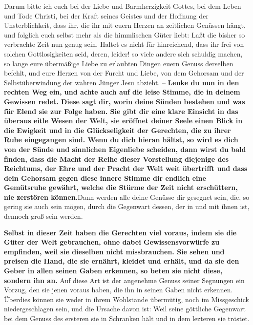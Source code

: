 \label{ref:04_23_innere_stimme}
Darum bitte ich euch bei der Liebe und Barmherzigkeit Gottes, bei dem Leben und
Tode Christi, bei der Kraft seines Geistes und der Hoffnung der Unsterblichkeit,
dass ihr, die ihr mit euern Herzen an zeitlichen Genüssen hängt, und folglich
euch selbst mehr als die himmlischen Güter liebt: Laßt die bisher so
verbrachte Zeit nun genug sein. Haltet es nicht für hinreichend, dass ihr frei
von solchen Gottlosigkeiten seid, deren, leider! so viele andere sich schuldig
machen, so lange eure übermäßige Liebe zu erlaubten Dingen euern Genuss
derselben
befehlt, und eure Herzen von der Furcht und Liebe, von dem Gehorsam und der
Selbstüberwindung der wahren Jünger Jesu abzieht. -- \textbf{Lenke du nun in den
rechten Weg ein, und achte auch auf die leise Stimme, die in deinem Gewissen
redet.
Diese sagt dir, worin deine Sünden bestehen und was für Elend sie zur Folge
haben. Sie gibt dir eine klare Einsicht in das überaus eitle Wesen der Welt,
sie eröffnet deiner Seele einen Blick in die Ewigkeit und in die Glückseligkeit
der Gerechten, die zu ihrer Ruhe eingegangen sind. Wenn du dich hieran hältst,
so wird es dich von der Sünde und sinnlichen Eigenliebe scheiden, dann wirst du
bald finden, dass die Macht der Reihe dieser Vorstellung diejenige des
Reichtums, der Ehre und der Pracht der Welt weit übertrifft und dass dein
Gehorsam gegen diese innere Stimme
dir endlich eine Gemütsruhe gewährt, welche
die Stürme der Zeit nicht erschüttern, nie zerstören können.}Dann werden alle
deine Genüsse dir gesegnet sein, die, so gering sie auch sein mögen, durch die
Gegenwart dessen, der in und mit ihnen ist, dennoch groß sein werden.
\label{ref:04_23_innere_stimme_ende}

\medskip

\label{ref:04_23_dinge_der_welt}
\textbf{Selbst in dieser Zeit haben die Gerechten viel voraus, indem sie die
Güter der
Welt gebrauchen, ohne dabei Gewissensvorwürfe zu empfinden, weil sie dieselben
nicht missbrauchen. Sie sehen und preisen die Hand, die sie ernährt, kleidet und
erhält, und da sie den Geber in allen seinen Gaben erkennen, so beten sie nicht
diese, sondern ihn an.} Auf diese Art ist der angenehme Genuss seiner Segnungen
ein Vorzug, den sie jenen voraus haben, die ihn in seinen Gaben nicht
erkennen. Überdies können sie weder in ihrem Wohlstande übermütig, noch im
Missgeschick niedergeschlagen sein, und die Ursache davon ist: Weil seine
göttliche Gegenwart bei dem Genuss des ersteren sie in Schranken hält und in
dem lezteren sie tröstet.

